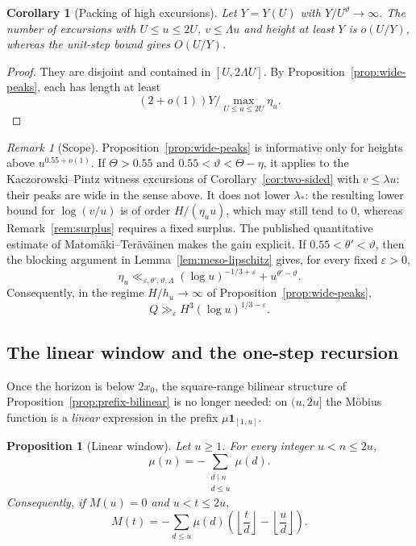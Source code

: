 \documentclass[11pt]{amsart}
\numberwithin{equation}{section}
\theoremstyle{plain}
\newtheorem{proposition}[theorem]{Proposition}
\newtheorem{corollary}[theorem]{Corollary}
\theoremstyle{definition}
\theoremstyle{remark}
\newtheorem{remark}[theorem]{Remark}
\begin{document}
\begin{corollary}[Packing of high excursions]
\label{cor:packing}
Let $Y=Y(U)$ with $Y/U^\vartheta\to\infty$. The number of excursions with
$U\le u\le2U$, $v\le\Lambda u$ and height at least $Y$ is
$o(U/Y)$, whereas the unit-step bound gives $O(U/Y)$.
\end{corollary}

\begin{proof}
They are disjoint and contained in $[U,2\Lambda U]$. By
Proposition~\ref{prop:wide-peaks}, each has length at least
\[
 (2+o(1))Y/\max_{U\le u\le2U}\eta_u.
\]
\end{proof}

\begin{remark}[Scope]
\label{rem:wide-peaks-scope}
Proposition~\ref{prop:wide-peaks} is informative only for heights above
$u^{0.55+o(1)}$. If $\Theta>0.55$ and $0.55<\vartheta<\Theta-\eta$, it
applies to the Kaczorowski--Pintz witness excursions of
Corollary~\ref{cor:two-sided} with $v\le\lambda u$: their peaks are wide in
the sense above. It does not lower $\lambda_*$: the resulting lower bound
for $\log(v/u)$ is of order $H/(\eta_uu)$, which may still tend to $0$,
whereas Remark~\ref{rem:surplus} requires a fixed surplus. The published
quantitative estimate of Matom\"aki--Ter\"av\"ainen
\cite[Theorem~1.1]{MatomakiTeravainen2023} makes the gain explicit. If
$0.55<\theta'<\vartheta$, then the blocking argument in
Lemma~\ref{lem:meso-lipschitz} gives, for every fixed $\varepsilon>0$,
\[
\eta_u\ll_{\varepsilon,\theta',\vartheta,\Lambda}
(\log u)^{-1/3+\varepsilon}+u^{\theta'-\vartheta}.
\]
Consequently, in the regime $H/h_u\to\infty$ of
Proposition~\ref{prop:wide-peaks},
\[
Q\gg_{\varepsilon}H^3(\log u)^{1/3-\varepsilon}.
\]
\end{remark}



\subsection{The linear window and the one-step recursion}
\label{subsec:linear-window}

Once the horizon is below $2x_0$, the square-range bilinear structure of
Proposition~\ref{prop:prefix-bilinear} is no longer needed: on $(u,2u]$ the
M\"obius function is a \emph{linear} expression in the prefix
$\mu\mathbf 1_{[1,u]}$.

\begin{proposition}[Linear window]
\label{prop:linear-window}
Let $u\ge1$. For every integer $u<n\le2u$,
\begin{equation}
\label{eq:linear-window-mu}
\mu(n)=-\sum_{\substack{d\mid n\\ d\le u}}\mu(d).
\end{equation}
Consequently, if $M(u)=0$ and $u<t\le2u$,
\begin{equation}
\label{eq:linear-window-M}
M(t)=-\sum_{d\le u}\mu(d)\left(\left\lfloor\frac td\right\rfloor
-\left\lfloor\frac ud\right\rfloor\right).
\end{equation}
\end{proposition}
\end{document}
